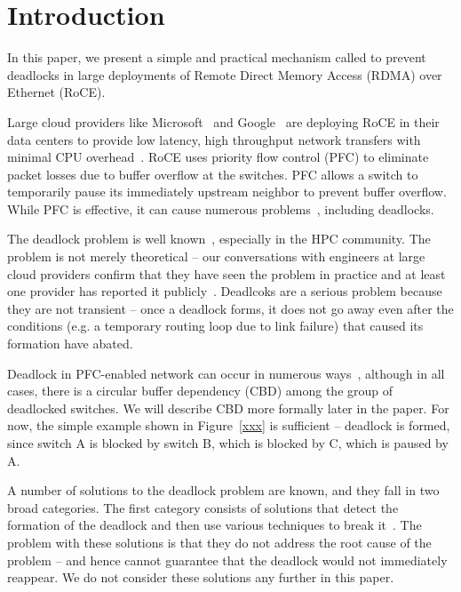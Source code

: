 \section{Introduction}
\label{sec:intro}

In this paper, we present a simple and practical mechanism called \sysname{} to prevent deadlocks
in large deployments of Remote Direct Memory Access (RDMA) over Ethernet (RoCE).

Large cloud providers like Microsoft~\cite{dcqcn} and Google~\cite{timely} are
deploying RoCE in their data centers to provide low latency, high throughput
network transfers with minimal CPU overhead~\cite{dcqcn}.  RoCE uses priority
flow control (PFC) to eliminate packet losses due to buffer overflow at the
switches. PFC allows a switch to temporarily pause its immediately upstream
neighbor to prevent buffer overflow. While PFC is effective, it can cause
numerous problems~\cite{dcqcn}, including deadlocks. 

The deadlock problem is well known~\cite{xxx}, especially in the HPC community. The
problem is not merely theoretical -- our conversations with engineers at large
cloud providers confirm that they have seen the problem in practice and at least
one provider has reported it publicly~\cite{cxpaper}. Deadlcoks are a serious
problem because they are not transient -- once a deadlock forms, it does not go
away even after the conditions (e.g. a temporary routing loop due to link
failure) that caused its formation have abated.

Deadlock in PFC-enabled network can occur in numerous ways~\cite{hotnetspaper},
although in all cases, there is a circular buffer dependency (CBD) among the
group of deadlocked switches. We will describe CBD more formally later in the
paper. For now, the simple example shown in Figure~\ref{xxx} is sufficient --
deadlock is formed, since switch A is blocked by switch B, which is blocked by
C, which is paused by A.

A number of solutions to the deadlock problem are known, and they fall in two
broad categories. The first category consists of solutions that detect the
formation of the deadlock and then use various techniques to break
it~\cite{mellnoaxhotnetspaper}. The problem with these solutions is that they do
not address the root cause of the problem -- and hence cannot guarantee that the
deadlock would not immediately reappear. We do not consider these solutions any
further in this paper. 

